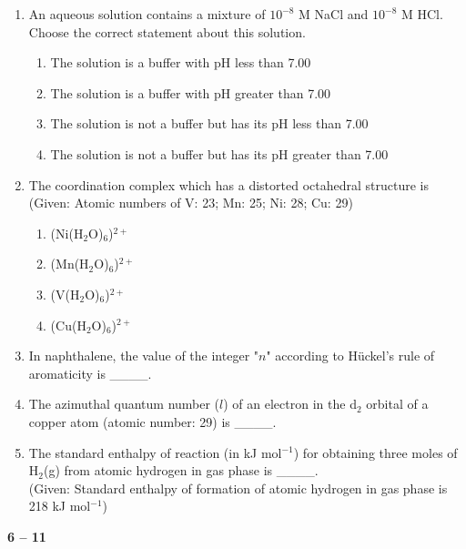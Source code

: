 \documentclass[journal,12pt,onecolumn]{IEEEtran}
\begin{document}
\begin{enumerate}[label=\arabic*.]

\item An aqueous solution contains a mixture of $10^{-8}$ M NaCl and $10^{-8}$ M HCl. Choose the correct statement about this solution.
\begin{enumerate}[label=(\Alph*)]
    \item The solution is a buffer with pH less than 7.00
    \item The solution is a buffer with pH greater than 7.00
    \item The solution is not a buffer but has its pH less than 7.00
    \item The solution is not a buffer but has its pH greater than 7.00
\end{enumerate}

\item The coordination complex which has a distorted octahedral structure is\\
(Given: Atomic numbers of V: 23; Mn: 25; Ni: 28; Cu: 29)
\begin{multicols}{2}
\begin{enumerate}[label=(\Alph*)]
    \item (Ni(H$_2$O)$_6$)$^{2+}$
    \item (Mn(H$_2$O)$_6$)$^{2+}$
    \item (V(H$_2$O)$_6$)$^{2+}$
    \item (Cu(H$_2$O)$_6$)$^{2+}$
\end{enumerate}
\end{multicols}

\item In naphthalene, the value of the integer "$n$" according to Hückel's rule of aromaticity is \_\_\_\_.

\item The azimuthal quantum number ($l$) of an electron in the d$_2$ orbital of a copper atom (atomic number: 29) is \_\_\_\_.

\item The standard enthalpy of reaction (in kJ mol$^{-1}$) for obtaining three moles of H$_2$(g) from atomic hydrogen in gas phase is \_\_\_\_.\\
(Given: Standard enthalpy of formation of atomic hydrogen in gas phase is 218 kJ mol$^{-1}$)

\end{enumerate}
\noindent \textbf{6 -- 11}
\end{document}
